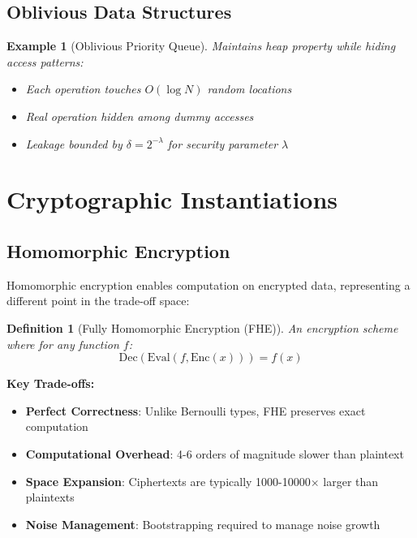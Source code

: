 \documentclass[11pt,final,hidelinks]{article}
\newtheorem{definition}[theorem]{Definition}
\newtheorem{example}[theorem]{Example}
\begin{document}
\subsection{Oblivious Data Structures}

\begin{example}[Oblivious Priority Queue]
Maintains heap property while hiding access patterns:
\begin{itemize}
    \item Each operation touches $O(\log N)$ random locations
    \item Real operation hidden among dummy accesses
    \item Leakage bounded by $\delta = 2^{-\lambda}$ for security parameter $\lambda$
\end{itemize}
\end{example}

\section{Cryptographic Instantiations}

\subsection{Homomorphic Encryption}

Homomorphic encryption enables computation on encrypted data, representing a different point in the trade-off space:

\begin{definition}[Fully Homomorphic Encryption (FHE)]
An encryption scheme where for any function $f$:
\begin{equation}
\text{Dec}(\text{Eval}(f, \text{Enc}(x))) = f(x)
\end{equation}
\end{definition}

\textbf{Key Trade-offs:}
\begin{itemize}
    \item \textbf{Perfect Correctness}: Unlike Bernoulli types, FHE preserves exact computation
    \item \textbf{Computational Overhead}: 4-6 orders of magnitude slower than plaintext
    \item \textbf{Space Expansion}: Ciphertexts are typically 1000-10000× larger than plaintexts
    \item \textbf{Noise Management}: Bootstrapping required to manage noise growth
\end{itemize}
\end{document}
